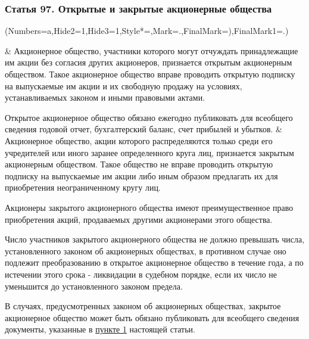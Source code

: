 \documentclass[a4page]{report}
\newcommand{\beginEasyList}{
        \begin{easylist}[enumerate]
            \ListProperties(Numbers=a,Hide2=1,Hide3=1,Style*=,Mark=.,FinalMark={)},FinalMark1=.)
    }
\newcommand{\eEasyList}{\end{easylist}}
\begin{document}
\subsubsection{{\bf Статья 97.} Открытые и закрытые акционерные общества}
\beginEasyList
& Акционерное общество, участники которого могут отчуждать принадлежащие им акции без согласия других акционеров, признается открытым акционерным обществом. Такое акционерное общество вправе проводить открытую подписку на выпускаемые им акции и их свободную продажу на условиях, устанавливаемых законом и иными правовыми актами.
\par Открытое акционерное общество обязано ежегодно публиковать для всеобщего сведения годовой отчет, бухгалтерский баланс, счет прибылей и убытков.
& Акционерное общество, акции которого распределяются только среди его учредителей или иного заранее определенного круга лиц, признается закрытым акционерным обществом. Такое общество не вправе проводить открытую подписку на выпускаемые им акции либо иным образом предлагать их для приобретения неограниченному кругу лиц.
\par Акционеры закрытого акционерного общества имеют преимущественное право приобретения акций, продаваемых другими акционерами этого общества.
\par Число участников закрытого акционерного общества не должно превышать числа, установленного законом об акционерных обществах, в противном случае оно подлежит преобразованию в открытое акционерное общество в течение года, а по истечении этого срока - ликвидации в судебном порядке, если их число не уменьшится до установленного законом предела.
\par В случаях, предусмотренных законом об акционерных обществах, закрытое акционерное общество может быть обязано публиковать для всеобщего сведения документы, указанные в \uline{пункте 1} настоящей статьи.
\eEasyList
\end{document}
